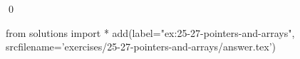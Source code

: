 
\begin{ex}
  \label{ex:25-27-pointers-and-arrays}
  
  \qed
\end{ex}
\begin{python0}
from solutions import *
add(label="ex:25-27-pointers-and-arrays",
    srcfilename='exercises/25-27-pointers-and-arrays/answer.tex')
\end{python0}
